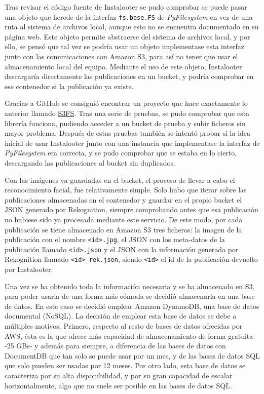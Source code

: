 Tras revisar el código fuente de Instalooter se pudo comprobar se puede pasar una objeto que herede de la interfaz \texttt{fs.base.FS} de \textit{PyFilesystem} en vez de una ruta al sistema de archivos local, aunque esto no se encuentra documentado en su página web. Este objeto permite abstraerse del sistema de archivos local, y por ello, se pensó que tal vez se podría usar un objeto implementase esta interfaz junto con las comunicaciones con Amazon S3, para así no tener que usar el almacenamiento local del equipo. Mediante el uso de este objeto, Instalooter descargaría directamente las publicaciones en un bucket, y podría comprobar en ese contenedor si la publicación ya existe.

Gracias a GitHub se consiguió encontrar un proyecto que hace exactamente lo anterior llamado \href{https://github.com/PyFilesystem/s3fs}{S3FS}. Tras una serie de pruebas, se pudo comprobar que esta librería funciona, pudiendo acceder a un bucket de prueba y subir ficheros sin mayor problema. Después de estas pruebas también se intentó probar si la idea inicial de usar Instalooter junto con una instancia que implementase la interfaz de \textit{PyFilesystem} era correcta, y se pudo comprobar que se estaba en lo cierto, descargando las publicaciones al bucket sin duplicados.

Con las imágenes ya guardadas en el bucket, el proceso de llevar a cabo el reconocimiento facial, fue relativamente simple. Solo hubo que iterar sobre las publicaciones almacenadas en el contenedor y guardar en el propio bucket el JSON generado por Rekognition, siempre comprobando antes que esa publicación no hubiese sido ya procesada mediante este servicio. De este modo, por cada publicación se tiene almacenado en Amazon S3 tres ficheros: la imagen de la publicación con el nombre \texttt{<id>.jpg}, el JSON con los meta-datos de la publicación llamado \texttt{<id>.json} y el JSON con la información generada por Rekognition llamado \texttt{<id>\_rek.json}, siendo \texttt{<id>} el id de la publicación devuelto por Instalooter.

Una vez se ha obtenido toda la información necesaria y se ha almacenado en S3, para poder usarla de una forma más cómoda se decidió almacenarla en una base de datos. En este caso se decidió emplear Amazon DynamoDB, una base de datos documental (NoSQL). La decisión de emplear esta base de datos se debe a múltiples motivos. Primero, respecto al resto de bases de datos ofrecidas por AWS, ésta es la que ofrece más capacidad de almacenamiento de forma gratuita -25 GBs- y además para siempre, a diferencia de las bases de datos con DocumentDB que tan solo se puede usar por un mes, y de las bases de datos SQL que solo pueden ser usadas por 12 meses. Por otro lado, esta base de datos se caracteriza por su alta disponibilidad, y por su gran capacidad de escalar horizontalmente, algo que no suele ser posible en las bases de datos SQL.

